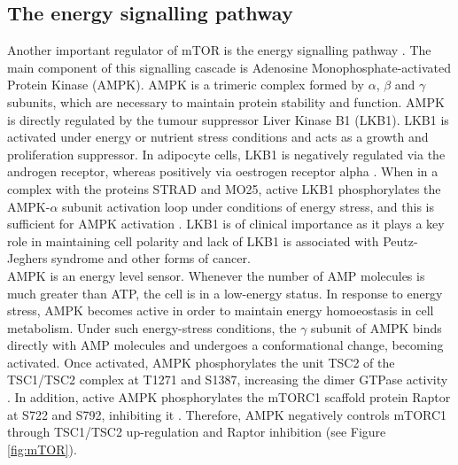 \subsection{The energy signalling pathway}
\label{subsec:The energy signalling pathway}
Another important regulator of mTOR is the energy signalling pathway \citep{Thedieck2009}. The main component of this signalling cascade is Adenosine Monophosphate-activated Protein Kinase (AMPK). AMPK is a trimeric complex formed by $\alpha$, $\beta$ and $\gamma$ subunits, which are necessary to maintain protein stability and function. AMPK is directly regulated by the tumour suppressor Liver Kinase B1 (LKB1). LKB1 is activated under energy or nutrient stress conditions and acts as a growth and proliferation suppressor. In adipocyte cells, LKB1 is negatively regulated via the androgen receptor, whereas positively via oestrogen receptor alpha \citep{McInnes2012}. When in a complex with the proteins STRAD and MO25, active LKB1 phosphorylates the AMPK-$\alpha$ subunit activation loop under conditions of energy stress, and this is sufficient for AMPK activation \citep{Shackelford2009}. LKB1 is of clinical importance as it plays a key role in maintaining cell polarity and lack of LKB1 is associated with Peutz-
Jeghers syndrome and other forms of cancer. \\
AMPK is an energy level sensor. Whenever the number of AMP molecules is much greater than ATP, the cell is in a low-energy status. In response to energy stress, AMPK becomes active in order to maintain energy homoeostasis in cell metabolism. Under such energy-stress conditions, the $\gamma$ subunit of AMPK binds directly with AMP molecules and undergoes a conformational change, becoming activated. Once activated, AMPK phosphorylates the unit TSC2 of the TSC1/TSC2 complex at T1271 and S1387, increasing the dimer GTPase activity \citep{Inoki2003, Inoki2005}. In addition, active AMPK phosphorylates the mTORC1 scaffold protein Raptor at S722 and S792, inhibiting it \citep{Gwinn2008}. Therefore, AMPK negatively controls mTORC1 through TSC1/TSC2 up-regulation and Raptor inhibition (see Figure \ref{fig:mTOR}). 

